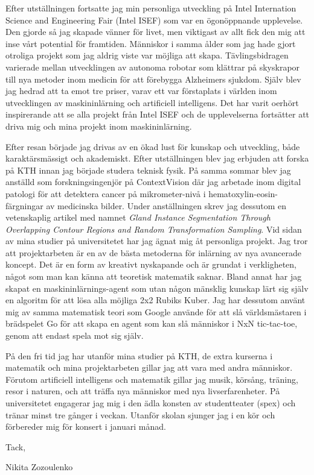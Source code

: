 \documentclass[11pt,a4paper]{article} %
\begin{document}
Efter utställningen fortsatte jag min personliga utveckling på Intel Internation Science and Engineering Fair (Intel ISEF) som var en ögonöppnande upplevelse. Den gjorde så jag skapade vänner för livet, men viktigast av allt fick den mig att inse vårt potential för framtiden. Människor i samma ålder som jag hade gjort otroliga projekt som jag aldrig viste var möjliga att skapa. Tävlingsbidragen varierade mellan utvecklingen av autonoma robotar som klättrar på skyskrapor till nya metoder inom medicin för att förebygga Alzheimers sjukdom.  Själv blev jag hedrad att ta emot tre priser, varav ett var förstaplats i världen inom utvecklingen av maskininlärning och artificiell intelligens. Det har varit oerhört inspirerande att se alla projekt från Intel ISEF och de upplevelserna fortsätter att driva mig och mina projekt inom maskininlärning.  

Efter resan började jag drivas av en ökad lust för kunskap och utveckling, både karaktärsmässigt och akademiskt. Efter utställningen blev jag erbjuden att forska på KTH innan jag började studera teknisk fysik. På samma sommar blev jag anställd som forskningsingenjör på ContextVision där jag arbetade inom digital patologi för att detektera cancer på mikrometer-nivå i hematoxylin-eosin-färgningar av medicinska bilder. Under anställningen skrev jag dessutom en vetenskaplig artikel med namnet \textit{Gland Instance Segmentation Through Overlapping Contour Regions and Random Transformation Sampling}. Vid sidan av mina studier på universitetet har jag ägnat mig åt personliga projekt. Jag tror att projektarbeten är en av de bästa metoderna för inlärning av nya avancerade koncept. Det är en form av kreativt nyskapande och är grundat i verkligheten, något som man kan känna att teoretisk matematik saknar. Bland annat har jag skapat en maskininlärnings-agent som utan någon mänsklig kunskap lärt sig själv en algoritm för att lösa alla möjliga 2x2 Rubiks Kuber.  Jag har dessutom använt mig av samma matematisk teori som Google använde för att slå världsmästaren i brädspelet Go för att skapa en agent som kan slå människor i NxN tic-tac-toe, genom att endast spela mot sig själv. 

På den fri tid jag har utanför mina studier på KTH, de extra kurserna i matematik och mina projektarbeten gillar jag att vara med andra människor. Förutom artificiell intelligens och matematik gillar jag musik, körsång, träning, resor i naturen, och att träffa nya människor med nya livserfarenheter. På universitetet engagerar jag mig i den ädla konsten av studentteater (spex) och tränar minst tre gånger i veckan. Utanför skolan sjunger jag i en kör och förbereder mig för konsert i januari månad. 

Tack,

Nikita Zozoulenko


\end{document}
